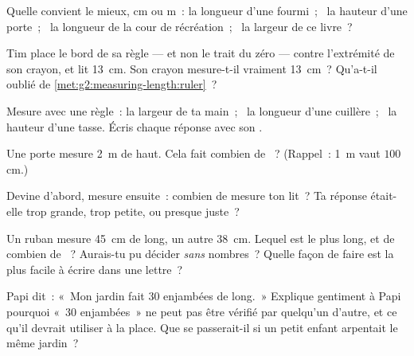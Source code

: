 \begin{exercise}[$\star$]\label{exo:g2:measuring-length:4}
Quelle  convient le mieux, \unit{cm} ou \unit{m}~: la longueur
d'une fourmi~; \ la hauteur d'une porte~; \ la longueur de la cour de
récréation~; \ la largeur de ce livre~?
\end{exercise}

\begin{exercise}[$\star$]\label{exo:g2:measuring-length:5}
Tim place le bord de sa règle --- et non le trait du zéro --- contre
l'extrémité de son crayon, et lit \qty{13}{cm}. Son crayon mesure-t-il
vraiment \qty{13}{cm}~? Qu'a-t-il oublié de
\cref{met:g2:measuring-length:ruler}~?
\end{exercise}

\begin{exercise}[$\star$]\label{exo:g2:measuring-length:6}
Mesure avec une règle~: la largeur de ta main~; \ la longueur d'une
cuillère~; \ la hauteur d'une tasse. Écris chaque réponse avec son
.
\end{exercise}

\begin{exercise}[$\star$]\label{exo:g2:measuring-length:7}
Une porte mesure \qty{2}{m} de haut. Cela fait combien de
~? (Rappel~: \qty{1}{m} vaut $100$ \unit{cm}.)
\end{exercise}

\begin{exercise}[$\star$]\label{exo:g2:measuring-length:8}
Devine d'abord, mesure ensuite~: combien de  mesure ton lit~?
Ta réponse était-elle trop grande, trop petite, ou presque juste~?
\end{exercise}

\begin{exercise}[$\star\star$]\label{exo:g2:measuring-length:9}
Un ruban mesure \qty{45}{cm} de long, un autre \qty{38}{cm}. Lequel
est le plus long, et de combien de ~? Aurais-tu pu décider
\emph{sans} nombres~? Quelle façon de faire est la plus facile à
écrire dans une lettre~?
\end{exercise}

\begin{exercise}[$\star\star$]\label{exo:g2:measuring-length:10}
Papi dit~: «~Mon jardin fait $30$ enjambées de long.~» Explique
gentiment à Papi pourquoi «~$30$ enjambées~» ne peut pas être
vérifié par quelqu'un d'autre, et ce qu'il devrait utiliser à la
place. Que se passerait-il si un petit enfant arpentait le même
jardin~?
\end{exercise}

